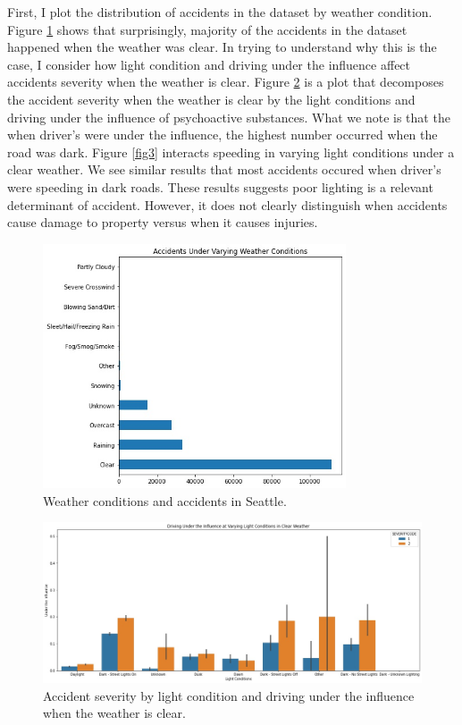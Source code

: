\documentclass[a4paper,12pt]{article}
\begin{document}
First, I plot the distribution of accidents in the dataset by weather condition. Figure \ref{fig1} shows that surprisingly, majority of the accidents in the dataset happened when the weather was clear. In trying to understand why this is the case, I consider how light condition and driving under the influence affect accidents severity when the weather is clear. Figure \ref{fig2} is a plot that decomposes the accident severity when the weather is clear by the light conditions and driving under the influence of psychoactive substances. What we note is that the when driver's were under the influence, the highest number occurred when the road was dark. Figure \ref{fig3} interacts speeding in varying light conditions under a clear weather. We see similar results that most accidents occured when driver's were speeding in dark roads. These results suggests poor lighting is a relevant determinant of accident. However, it does not clearly distinguish when accidents cause damage to property versus when it causes injuries. \\


\begin{figure}[H]
	\centering
	\includegraphics[width=0.8\textwidth]{weather.jpg}
	\caption{Weather conditions and accidents in Seattle.}
	\label{fig1}
\end{figure}


\begin{figure}[H]
	\centering
	\includegraphics[width=1.0\textwidth]{li_un_wet.jpg}
	\caption{Accident severity by light condition and driving under the influence when the weather is clear. }
	\label{fig2}
\end{figure}
\end{document}
